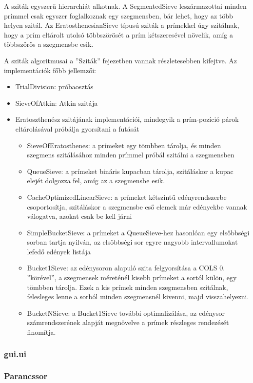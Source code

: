 A sziták egyszerű hierarchiát alkotnak.
A SegmentedSieve leszármazottai minden prímmel csak egyszer foglalkoznak egy szegmensben, bár lehet, hogy az több helyen szitál.
Az EratosthenesianSieve típusú sziták a prímekkel úgy szitálnak, hogy a prím eltárolt utolsó többszörösét a prím kétszeresével növelik, amíg a többszörös a szegmensbe esik.

A sziták algoritmusai a ''Sziták'' fejezetben vannak részletesebben kifejtve.
Az implementációk főbb jellemzői:
\begin{itemize}
\item TrialDivision: próbaosztás
\item SieveOfAtkin: Atkin szitája
\item Eratoszthenész szitájának implementációi, mindegyik a prím-pozíció párok eltárolásával próbálja gyorsítani a futását
\begin{itemize}
\item SieveOfEratosthenes: a prímeket egy tömbben tárolja, és minden szegmens szitálásához minden prímmel próbál szitálni a szegmensben
\item QueueSieve: a prímeket bináris kupacban tárolja, szitáláskor a kupac elejét dolgozza fel, amíg az a szegmensbe esik.
\item CacheOptimizedLinearSieve: a prímeket kétszintű edényrendszerbe csoportosítja, szitáláskor a szegmensbe eső elemek már edényekbe vannak válogatva, azokat csak be kell járni
\item SimpleBucketSieve: a prímeket a QueueSieve-hez hasonlóan egy elsőbbségi sorban tartja nyilván, az elsőbbségi sor egyre nagyobb intervallumokat lefedő edények listája
\item Bucket1Sieve: az edénysoron alapuló szita felgyorsítása a COLS 0. ''körével'', a szegmensek méreténél kisebb prímeket a sortól külön, egy tömbben tárolja. Ezek a kis prímek minden szegmensben szitálnak, felesleges lenne a sorból minden szegmensnél kivenni, majd visszahelyezni.
\item BucketNSieve: a Bucket1Sieve további optimalizálása, az edénysor számrendszerének alapját megnövelve a prímek részleges rendezését finomítja.
\end{itemize}
\end{itemize}

\subsubsection{gui.ui}

\subsubsection{Parancssor}

